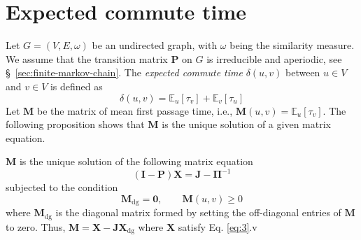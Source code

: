 \section{Expected commute time}
\label{sec:expect-comm-time}
Let $G = (V,E,\omega)$ be an undirected graph, with $\omega$ being the
similarity measure. We assume that the transition matrix
$\mathbf{P}$ on $G$ is irreducible and aperiodic, see
\S ~\ref{sec:finite-markov-chain}. The {\em expected commute time}
$\delta(u,v)$ between $u \in V$ and $v \in V$ is defined as
\begin{equation}
  \label{eq:25}
  \delta(u,v) = \mathbb{E}_{u}[\tau_v] + \mathbb{E}_{v}[\tau_u] 
\end{equation}
%
\noindent Let $\mathbf{M}$ be the matrix of mean first passage time,
i.e., $\mathbf{M}(u,v) = \mathbb{E}_{u}[\tau_v]$. The following
proposition shows that $\mathbf{M}$ is the unique solution of a given
matrix equation.
\begin{proposition}
  \label{prop:4}
 $\mathbf{M}$ is the unique solution of the following matrix equation
  \begin{equation}
    \label{eq:3}
   (\mathbf{I} - \mathbf{P})\mathbf{X} = \mathbf{J} - \bm{\Pi}^{-1}
  \end{equation}
  subjected to the condition 
  \begin{equation}
    \label{eq:32}
 \mathbf{M}_{\mathrm{dg}} = \mathbf{0}, \qquad \mathbf{M}(u,v) \geq 0   
  \end{equation}
  where $\mathbf{M}_{\mathrm{dg}}$ is the diagonal matrix formed
    by setting the off-diagonal entries of $\mathbf{M}$ to zero.
    Thus, $\mathbf{M} = \mathbf{X} -
    \mathbf{J}\mathbf{X}_{\mathrm{dg}}$ where $\mathbf{X}$ satisfy
    Eq. \eqref{eq:3}.v
\end{proposition}
